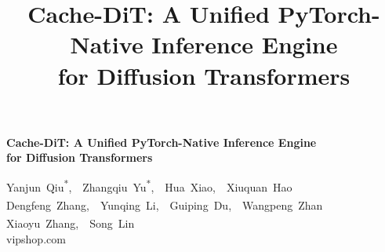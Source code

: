 \documentclass[10pt]{article}
\title{Cache-DiT: A Unified PyTorch-Native Inference Engine \\ for Diffusion Transformers}
\date{}
\begin{document}
\begin{center}
{\LARGE\bfseries Cache-DiT: A Unified PyTorch-Native Inference Engine \\[4pt] for Diffusion Transformers\par}
\vspace{10pt}
{\large
\mbox{Yanjun~Qiu}\textsuperscript{*},~~\mbox{Zhangqiu~Yu}\textsuperscript{*},~~\mbox{Hua~Xiao}\textsuperscript{\dag},~~\mbox{Xiuquan~Hao}\textsuperscript{\dag} \\
\mbox{Dengfeng~Zhang}\textsuperscript{\dag},~~\mbox{Yunqing~Li}\textsuperscript{\dag},~~\mbox{Guiping~Du}\textsuperscript{\dag},~~\mbox{Wangpeng~Zhan}\textsuperscript{\dag} \\
\mbox{Xiaoyu~Zhang}\textsuperscript{\ddag},~~\mbox{Song~Lin}\textsuperscript{\ddag} \\[6pt]
vipshop.com
\par}
\end{center}
\vspace{4pt}
\end{document}
